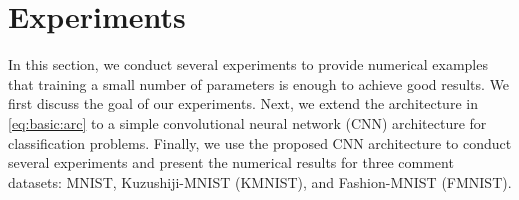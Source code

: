 \documentclass[nohyperref]{article}
\theoremstyle{plain}
\theoremstyle{definition}
\theoremstyle{remark}
\begin{document}
\section{Experiments}\label{sec:experiments}
In this section, we conduct several experiments to provide numerical examples that training a small number of parameters is enough to achieve good results. We first discuss the goal of our experiments.
Next,
we extend the architecture in \eqref{eq:basic:arc} to
a simple convolutional neural
network (CNN) architecture for classification problems. Finally, we use the proposed CNN architecture to conduct several experiments and present the numerical results for three comment datasets: MNIST, Kuzushiji-MNIST (KMNIST), and Fashion-MNIST (FMNIST).

\end{document}
